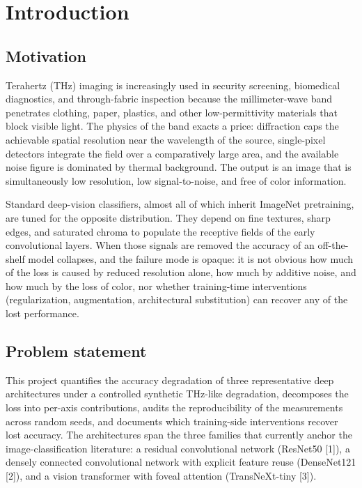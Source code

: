 \section{Introduction}
\label{sec:intro}

\subsection{Motivation}
Terahertz (THz) imaging is increasingly used in security screening, biomedical
diagnostics, and through-fabric inspection because the millimeter-wave band
penetrates clothing, paper, plastics, and other low-permittivity materials
that block visible light. The physics of the band exacts a price: diffraction
caps the achievable spatial resolution near the wavelength of the source,
single-pixel detectors integrate the field over a comparatively large area,
and the available noise figure is dominated by thermal background. The output
is an image that is simultaneously low resolution, low signal-to-noise, and
free of color information.

Standard deep-vision classifiers, almost all of which inherit ImageNet
pretraining, are tuned for the opposite distribution. They depend on fine
textures, sharp edges, and saturated chroma to populate the receptive fields
of the early convolutional layers. When those signals are removed the accuracy
of an off-the-shelf model collapses, and the failure mode is opaque: it is
not obvious how much of the loss is caused by reduced resolution alone, how
much by additive noise, and how much by the loss of color, nor whether
training-time interventions (regularization, augmentation, architectural
substitution) can recover any of the lost performance.

\subsection{Problem statement}
This project quantifies the accuracy degradation of three representative deep
architectures under a controlled synthetic THz-like degradation, decomposes
the loss into per-axis contributions, audits the reproducibility of the
measurements across random seeds, and documents which training-side
interventions recover lost accuracy. The architectures span the three families
that currently anchor the image-classification literature: a residual
convolutional network (ResNet50 [1]), a densely connected
convolutional network with explicit feature reuse (DenseNet121
[2]), and a vision transformer with foveal attention
(TransNeXt-tiny [3]).

